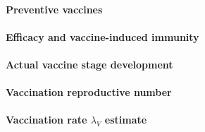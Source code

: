 \paragraph{Preventive vaccines}
\paragraph{Efficacy and vaccine-induced immunity}
\paragraph{Actual vaccine stage development}
\paragraph{Vaccination reproductive number}
\paragraph{Vaccination rate $\lambda_V$ estimate}
